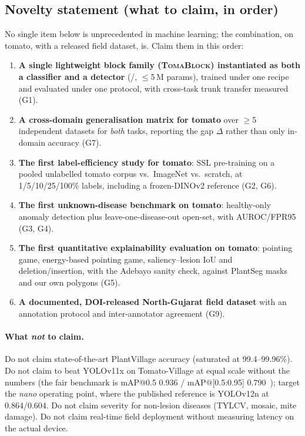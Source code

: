\subsection{Novelty statement (what to claim, in order)}
No single item below is unprecedented in machine learning; the combination, on tomato, with a released field dataset, is. Claim them in this order:
\begin{enumerate}
  \item \textbf{A single lightweight block family (\textsc{TomaBlock}) instantiated as both a classifier and a detector} (\modelcls{}/\modeldet{}, $\le$5\,M params), trained under one recipe and evaluated under one protocol, with cross-task trunk transfer measured (G1).
  \item \textbf{A cross-domain generalisation matrix for tomato} over $\ge$5 independent datasets for \emph{both} tasks, reporting the gap $\Delta$ rather than only in-domain accuracy (G7).
  \item \textbf{The first label-efficiency study for tomato}: SSL pre-training on a pooled unlabelled tomato corpus vs.\ ImageNet vs.\ scratch, at 1/5/10/25/100\% labels, including a frozen-DINOv2 reference (G2, G6).
  \item \textbf{The first unknown-disease benchmark on tomato}: healthy-only anomaly detection plus leave-one-disease-out open-set, with AUROC/FPR95 (G3, G4).
  \item \textbf{The first quantitative explainability evaluation on tomato}: pointing game, energy-based pointing game, saliency--lesion IoU and deletion/insertion, with the Adebayo sanity check, against PlantSeg masks and our own polygons (G5).
  \item \textbf{A documented, DOI-released North-Gujarat field dataset} with an annotation protocol and inter-annotator agreement (G9).
\end{enumerate}

\paragraph{What \emph{not} to claim.} Do not claim state-of-the-art PlantVillage accuracy (saturated at 99.4--99.96\%). Do not claim to beat YOLOv11x on Tomato-Village at equal scale without the numbers (the fair benchmark is mAP@0.5 0.936 / mAP@[0.5:0.95] 0.790~\cite{ramos2025}); target the \emph{nano} operating point, where the published reference is YOLOv12n at 0.864/0.604. Do not claim severity for non-lesion diseases (TYLCV, mosaic, mite damage). Do not claim real-time field deployment without measuring latency on the actual device.
